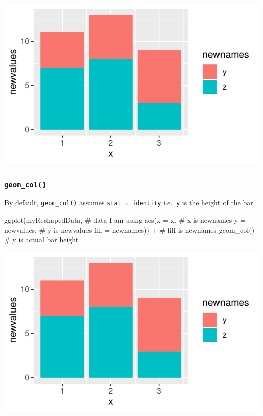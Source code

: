\documentclass[nofonts,]{tufte-handout}
\newenvironment{Shaded}{}{}
\newcommand{\AttributeTok}[1]{#1}
\newcommand{\CommentTok}[1]{\textcolor[rgb]{0.00,0.50,0.00}{#1}}
\newcommand{\FunctionTok}[1]{#1}
\newcommand{\NormalTok}[1]{#1}
\newcommand{\SpecialCharTok}[1]{\textcolor[rgb]{0.00,0.50,0.50}{#1}}
\begin{document}
\includegraphics{bar-charts-in-ggplot-with-multiple-outcomes_files/figure-latex/unnamed-chunk-4-1}

\hypertarget{geom_col}{%
\subsubsection{\texorpdfstring{\texttt{geom\_col()}}{geom\_col()}}\label{geom_col}}

By default, \texttt{geom\_col()} assumes
\texttt{stat\ =\ \textquotesingle{}identity\textquotesingle{}}
i.e.~\texttt{y} is the height of the bar.

\begin{Shaded}
\begin{Highlighting}[]
\FunctionTok{ggplot}\NormalTok{(myReshapedData, }\CommentTok{\# data I am using}
       \FunctionTok{aes}\NormalTok{(}\AttributeTok{x =}\NormalTok{ x, }\CommentTok{\# x is newnames}
           \AttributeTok{y =}\NormalTok{ newvalues, }\CommentTok{\# y is newvalues}
           \AttributeTok{fill =}\NormalTok{ newnames)) }\SpecialCharTok{+} \CommentTok{\# fill is newnames}
  \FunctionTok{geom\_col}\NormalTok{() }\CommentTok{\# y is actual bar height}
\end{Highlighting}
\end{Shaded}

\includegraphics{bar-charts-in-ggplot-with-multiple-outcomes_files/figure-latex/unnamed-chunk-5-1}
\end{document}
